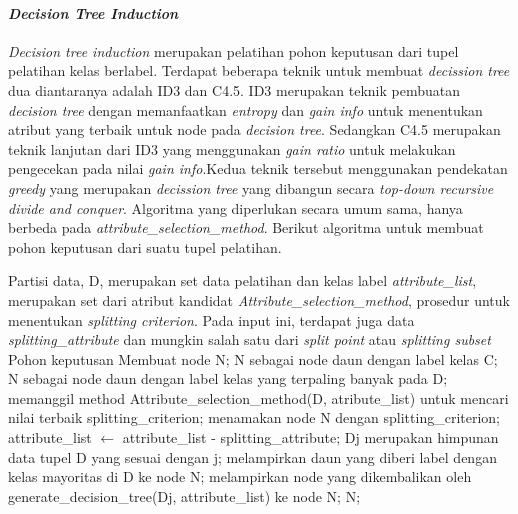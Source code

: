 \paragraph{\textsl{Decision Tree Induction}}

\textsl{Decision tree induction} merupakan pelatihan pohon keputusan dari tupel pelatihan kelas berlabel. Terdapat beberapa teknik untuk membuat \textsl{decission tree} dua diantaranya adalah ID3 dan C4.5. ID3 merupakan teknik pembuatan \textsl{decision tree} dengan memanfaatkan \textsl{entropy} dan \textsl{gain info} untuk menentukan atribut yang terbaik untuk node pada \textsl{decision tree}. Sedangkan C4.5 merupakan teknik lanjutan dari ID3 yang menggunakan \textsl{gain ratio} untuk melakukan pengecekan pada nilai \textsl{gain info}.Kedua teknik tersebut menggunakan pendekatan \textsl{greedy} yang merupakan \textsl{decission tree} yang dibangun secara \textsl{top-down recursive divide and conquer}. Algoritma yang diperlukan secara umum sama, hanya berbeda pada \textsl{attribute\_selection\_method}. Berikut algoritma untuk membuat pohon keputusan dari suatu tupel pelatihan.


\begin{algorithmic}[1]
	\REQUIRE Partisi data, D, merupakan set data pelatihan dan kelas label
	\REQUIRE \textsl{attribute\_list}, merupakan set dari atribut kandidat
	\REQUIRE \textsl{Attribute\_selection\_method}, prosedur untuk menentukan \textsl{splitting criterion}. Pada input ini, terdapat juga data \textsl{splitting\_attribute} dan mungkin salah satu dari \textsl{split point} atau \textsl{splitting subset}
	\ENSURE Pohon keputusan
	\STATE Membuat node N;
	  \RETURN N sebagai node daun dengan label kelas C;
	\ENDIF
		\RETURN N sebagai node daun dengan label kelas yang terpaling banyak pada D; 
	\ENDIF
	\STATE memanggil method Attribute\_selection\_method(D, atribute\_list) untuk mencari nilai terbaik splitting\_criterion;
	\STATE menamakan node N dengan splitting\_criterion;
		\STATE attribute\_list $\leftarrow$ attribute\_list - splitting\_attribute; 
	\ENDIF
		\STATE D\lowercase{j} merupakan himpunan data tupel D yang sesuai dengan j;
			\STATE melampirkan daun yang diberi label dengan kelas mayoritas di D ke node N;
		\ELSE
			\STATE melampirkan node yang dikembalikan oleh generate\_decision\_tree(D\lowercase{j}, attribute\_list) ke node N;
		\ENDIF
	\ENDFOR
\RETURN N;
\end{algorithmic}

